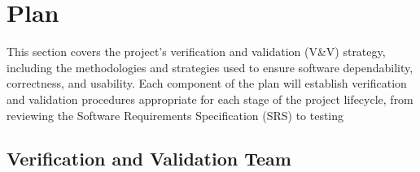 \documentclass[12pt, titlepage]{article}
\begin{document}
\section{Plan}


\noindent This section covers the project's verification and validation (V\&V) strategy, including the methodologies and strategies used to ensure software dependability, correctness, and usability. Each component of the plan will establish verification and validation procedures appropriate for each stage of the project lifecycle, from reviewing the Software Requirements Specification (SRS) to testing

\subsection{Verification and Validation Team}


\end{document}
